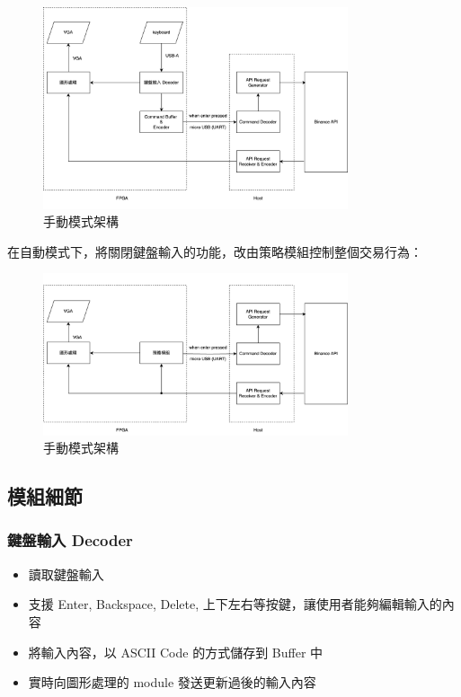 \documentclass[10.5pt,compsoc,UTF8]{CjC}
\theoremstyle{mystyle}
\begin{document}
\begin{figure}[h!]
  \centering
  \includegraphics[width=0.8\textwidth]{./img/Final-Project-1.png}
  \caption{手動模式架構}
\end{figure}

在自動模式下，將關閉鍵盤輸入的功能，改由策略模組控制整個交易行為：

\begin{figure}[h!]
  \centering
  \includegraphics[width=0.8\textwidth]{./img/Final-Project-2.png}
  \caption{手動模式架構}
\end{figure}

\subsection{模組細節}

\subsubsection*{鍵盤輸入 Decoder}

\begin{itemize}
  \item 讀取鍵盤輸入
  \item 支援 Enter, Backspace, Delete, 上下左右等按鍵，讓使用者能夠編輯輸入的內容
  \item 將輸入內容，以 ASCII Code 的方式儲存到 Buffer 中
  \item 實時向圖形處理的 module 發送更新過後的輸入內容
\end{itemize}
\end{document}

